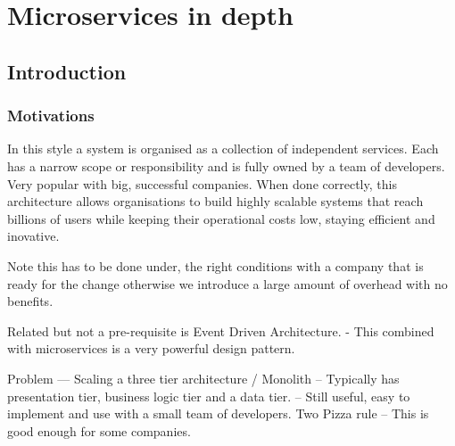 \documentclass[a4paper, 11pt]{book}
\begin{document}
    \chapter{Microservices in depth}
    \section{Introduction}
    \subsection{Motivations}
    In this style a system is organised as a collection of independent services.
    Each has a narrow scope or responsibility and is fully owned by a team of developers.
    Very popular with big, successful companies.
    When done correctly, this architecture allows organisations to build highly scalable systems that reach billions of users while keeping their operational costs low, staying efficient and inovative.

    Note this has to be done under, the right conditions with a company that is ready for the change otherwise we introduce a large amount of overhead with no benefits.

    Related but not a pre-requisite is Event Driven Architecture.
    - This combined with microservices is a very powerful design pattern.

    Problem --- Scaling a three tier architecture / Monolith
    -- Typically has presentation tier, business logic tier and a data tier.
    -- Still useful, easy to implement and use with a small team of developers. Two Pizza rule %
    -- This is good enough for some companies.
\end{document}
